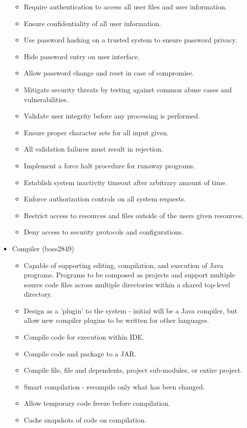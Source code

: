 \documentclass[11pt]{report}
\begin{document}
\begin{itemize}
\begin{itemize}
            \item Require authentication to access all user files and user information.
            \item Ensure confidentiality of all user information.
            \item Use password hashing on a trusted system to ensure password privacy.
            \item Hide password entry on user interface.
            \item Allow password change and reset in case of compromise.
            \item Mitigate security threats by testing against common abuse cases and vulnerabilities.
            \item Validate user integrity before any processing is performed.
            \item Ensure proper character sets for all input given.
            \item All validation failures must result in rejection.
            \item Implement a force halt procedure for runaway programs.
            \item Establish system inactivity timeout after arbitrary amount of time.
            \item Enforce authorization controls on all system requests.
            \item Restrict access to resources and files outside of the users given resources.
            \item Deny access to security protocols and configurations.\end{itemize}
        \item Compiler (boss2849) \begin{itemize}
            \item Capable of supporting editing, compilation, and execution of Java programs. Programs to be composed as projects and support multiple source code files across multiple directories within a shared top-level directory.
            \item Design as a 'plugin' to the system - initial will be a Java compiler, but allow new compiler plugins to be written for other languages.
            \item Compile code for execution within IDE.
            \item Compile code and package to a JAR.
            \item Compile file, file and dependents, project sub-modules, or entire project.
            \item Smart compilation - recompile only what has been changed. 
            \item Allow temporary code freeze before compilation.
            \item Cache snapshots of code on compilation. 
            \end{itemize}
    \end{itemize}
    
\end{document}
